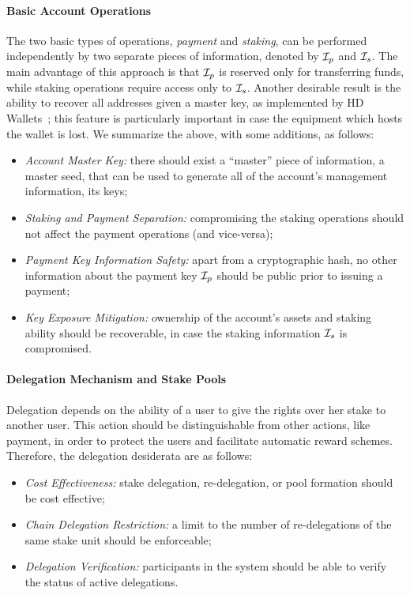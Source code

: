 \paragraph{Basic Account Operations}
The two basic types of operations, \ie \emph{payment} and \emph{staking}, can
be performed independently by two separate pieces of information, denoted by
$\mathcal{I}_p$ and $\mathcal{I}_s$. The main advantage of this approach is that $\mathcal{I}_p$ is
reserved only for transferring funds, while staking operations require access
only to $\mathcal{I}_s$.  Another desirable result is the ability to recover all
addresses given a master key, \eg as implemented by HD
Wallets~\cite{CCS:DasFauLos19,FC:GutSte15,bip32}; this feature is particularly
important in case the equipment which hosts the wallet is lost. We summarize
the above, with some additions, as follows:
\begin{itemize}
    \item \emph{Account Master Key:} there should exist a ``master'' piece of
        information, \eg a master seed, that can be used to generate all of the
        account's management information, \ie its keys;
    \item \emph{Staking and Payment Separation:} compromising the staking
        operations should not affect the payment operations (and vice-versa);
    \item \emph{Payment Key Information Safety:} apart from a cryptographic
        hash, no other information about the payment key $\mathcal{I}_p$ should be
        public prior to issuing a payment;
    \item \emph{Key Exposure Mitigation:} ownership of the account's assets and
        staking ability should be recoverable, in case the staking information
        $\mathcal{I}_s$ is compromised.
\end{itemize}

\paragraph{Delegation Mechanism and Stake Pools}
Delegation depends on the ability of a user to give the rights over her stake
to another user. This action should be distinguishable from other actions, like
payment, in order to protect the users and facilitate automatic reward schemes.
Therefore, the delegation desiderata are as follows:
\begin{itemize}
    \item \emph{Cost Effectiveness:} stake delegation, re-delegation, or pool
        formation should be cost effective;
    \item \emph{Chain Delegation Restriction:} a limit to the number of
        re-delegations of the same stake unit should be enforceable;
    \item \emph{Delegation Verification:} participants in the system should be
        able to verify the status of active delegations.
\end{itemize}

